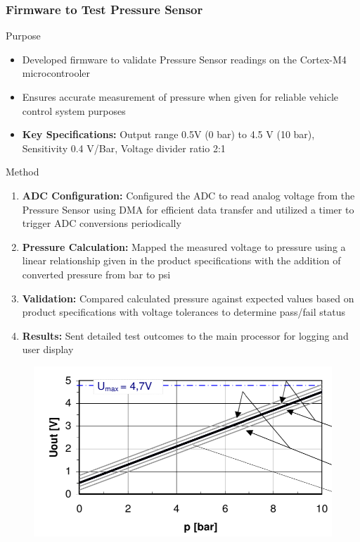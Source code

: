 \documentclass[8pt,compress,aspectratio=169]{beamer}
\newcommand\LightBold[1]{\textcolor{VSBlueLight}{\textbf{#1}}}
\begin{document}
\begin{frame}
    \frametitle{Firmware to Test Pressure Sensor}
    \begin{block}{Purpose}
        \small{
            \begin{itemize}
                \item Developed firmware to validate Pressure Sensor readings on the Cortex-M4 microcontrooler
                \item Ensures accurate measurement of pressure when given for reliable vehicle control system purposes
                \item \LightBold{Key Specifications:} Output range 0.5V (0 bar) to 4.5 V (10 bar), Sensitivity 0.4 V/Bar, Voltage divider ratio 2:1
            \end{itemize}
        }
    \end{block}
    \hspace{-0.5cm}
    \begin{minipage}{0.485\textwidth}
        \begin{block}{Method}
            \small{
                \begin{enumerate}
                    \tiny
                    \item \LightBold{ADC Configuration:} Configured the ADC to read analog voltage from the Pressure Sensor using DMA for efficient data transfer and utilized a timer to trigger ADC conversions periodically
                    \item \LightBold{Pressure Calculation:} Mapped the measured voltage to pressure using a linear relationship given in the product specifications with the addition of converted pressure from bar to psi
                    \item \LightBold{Validation:} Compared calculated pressure against expected values based on product specifications with voltage tolerances to determine pass/fail status
                    \item \LightBold{Results:} Sent detailed test outcomes to the main processor for logging and user display
                \end{enumerate}
            }
        \end{block}
    \end{minipage}
    \hfill
    \begin{minipage}{0.50\textwidth}
        \begin{figure}
            \centering
            \includegraphics[width=\textwidth]{assets/specs/adc_product_specs.png}

\end{figure}
\end{minipage}
\end{frame}
\end{document}
